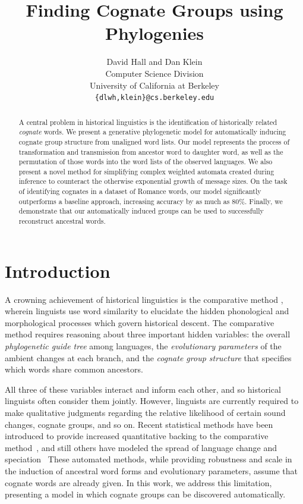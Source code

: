 \documentclass[11pt,a4paper]{article}
\title{Finding Cognate Groups using Phylogenies}
\author{David Hall and Dan Klein \\ Computer Science Division \\ University of California at Berkeley \\
\texttt{\{dlwh,klein\}@cs.berkeley.edu}}
\date{}
\begin{document}
\maketitle
\begin{abstract}
  A central problem in historical linguistics is the identification
  of historically related \emph{cognate} words.  We present a
  generative phylogenetic model for automatically inducing cognate
  group structure from unaligned word lists. Our model represents
  the process of transformation and transmission from ancestor word
  to daughter word, as well as the permutation of those words into
  the word lists of the observed languages. We also present a novel
  method for simplifying complex weighted automata created during
  inference to counteract the otherwise exponential growth of message
  sizes. On the task of identifying cognates in a dataset of Romance
  words, our model significantly outperforms a baseline approach,
  increasing accuracy by as much as 80\%. Finally, we demonstrate
  that our automatically induced groups can be used to successfully
  reconstruct ancestral words.
\end{abstract}
\section{Introduction}

A crowning achievement of historical linguistics is the comparative
method \cite{ohala93phonetics}, wherein linguists use word similarity
to elucidate the hidden phonological and morphological processes
which govern historical descent. The comparative method requires
reasoning about three important hidden variables: the overall
\emph{phylogenetic guide tree} among languages, the \emph{evolutionary
parameters} of the ambient changes at each branch, and the \emph{cognate
group structure} that specifies which words share common ancestors.

All three of these variables interact and inform each other, and
so historical linguists often consider them jointly.  However,
linguists are currently required to make qualitative judgments
regarding the relative likelihood of certain sound changes, cognate
groups, and so on.  Recent statistical methods have been introduced
to provide increased quantitative backing to the comparative
method~\cite{oakes00computer,bouchard07probabilistic,bouchard09improved},
and still others have modeled the spread of language change and
speciation~\cite{ringe02IE,daume07implication,daume09areal,nerbonne08measuring}
These automated methods, while providing robustness and scale in
the induction of ancestral word forms and evolutionary parameters,
assume that cognate words are already given.  In this work, we
address this limitation, presenting a model in which cognate groups
can be discovered automatically.
\end{document}
